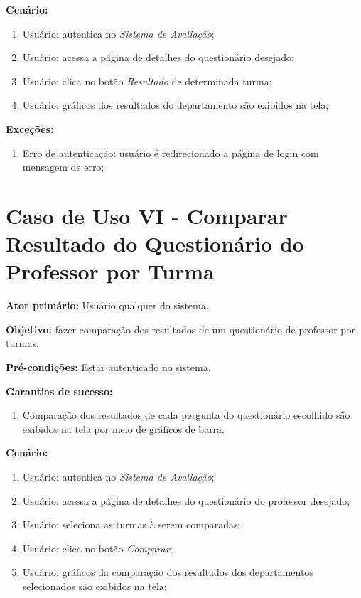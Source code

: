 \documentclass[
  12pt,       %
  openright,      %
  oneside,      %
  a4paper,      %
  english,      %
  french,        %
  spanish,     %
  brazil        %
  ]{abntex2-decsi}
\begin{document}
\begin{apendicesenv}
		\textbf{Cenário:}
		
		\begin{enumerate}
			\item Usuário: autentica no \textit{Sistema de Avaliação};           
			\item Usuário: acessa a página de detalhes do questionário desejado;
            \item Usuário: clica no botão \textit{Resultado} de determinada turma;
			\item Usuário: gráficos dos resultados do departamento são exibidos na tela;
		\end{enumerate}
		
		\textbf{Exceções:}
		
			\begin{enumerate}	
				\item Erro de autenticação: usuário é redirecionado a página de login com mensagem de erro;
			\end{enumerate}

	\newpage
    
    \section{Caso de Uso VI - Comparar Resultado do Questionário do Professor por Turma}
    
	\textbf{Ator primário:} Usuário qualquer do sistema.
				
    \textbf{Objetivo:} fazer comparação dos resultados de um questionário de professor por turmas.
    
	\textbf{Pré-condições:} Estar autenticado no sistema.
		
	\textbf{Garantias de sucesso:} 
        
            \begin{enumerate}
            
            \item Comparação dos resultados de cada pergunta do questionário escolhido são exibidos na tela por meio de gráficos de barra.  
            
            \end{enumerate}
        
		\textbf{Cenário:}
		
		\begin{enumerate}
			\item Usuário: autentica no \textit{Sistema de Avaliação};           
			\item Usuário: acessa a página de detalhes do questionário do professor desejado;
            \item Usuário: seleciona as turmas à serem comparadas;
            \item Usuário: clica no botão \textit{Comparar};
			\item Usuário: gráficos da comparação dos resultados dos departamentos selecionados são exibidos na tela;
		\end{enumerate}
		

\end{apendicesenv}
\end{document}
